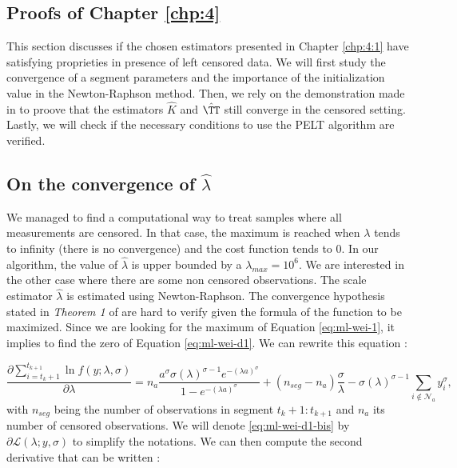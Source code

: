 \begin{appendices}
\chapter{Proofs of Chapter \ref{chp:4}} \label{app:chap4}

This section discusses if the chosen estimators presented in Chapter \ref{chp:4:1} have satisfying proprieties in presence of left censored data. We will first study the convergence of a segment parameters and the importance of the initialization value in the Newton-Raphson method. Then, we rely on the demonstration made in \cite{Lavielle1997} to proove that the estimators $\hat K$ and $\hat \TT$ still converge in the censored setting. Lastly, we will check if the necessary conditions to use the PELT algorithm are verified. 

\section{On the convergence of \texorpdfstring{$\hat\lambda$}{l}}

We managed to find a computational way to treat samples where all measurements are censored. In that case, the maximum is reached when $\lambda$ tends to infinity (there is no convergence) and the cost function tends to 0. In our algorithm, the value of $\hat\lambda$ is upper bounded by a $\lambda_{max} = 10^6$.   
We are interested in the other case where there are some non censored observations. The scale estimator $\hat\lambda$ is estimated using Newton-Raphson. The convergence hypothesis stated in \textit{Theorem 1} of \cite{Verbeke1995} are hard to verify given the formula of the function to be maximized. Since we are looking for the maximum of Equation \ref{eq:ml-wei-1}, it implies to find the zero of Equation \ref{eq:ml-wei-d1}. We can rewrite this equation : 

\begin{equation}\label{eq:ml-wei-d1-bis}
\frac{\partial\sum_{i=t_{k}+1}^{t_{k+1}}\ln f(y;\lambda,\sigma)}{\partial \lambda} = n_a\frac{a^\sigma\sigma(\lambda)^{\sigma-1}e^{-(\lambda a)^\sigma}}{1-e^{-(\lambda a)^\sigma}} + (n_{seg}-n_a)\frac{\sigma}{\lambda} - \sigma(\lambda)^{\sigma-1}\sum_{i \notin \mathcal{N}_a}y_i^{\sigma}, 
\end{equation}
with $n_{seg}$ being the number of observations in segment $t_{k}+1:t_{k+1}$ and $n_a$ its number of censored observations. We will denote \ref{eq:ml-wei-d1-bis} by $\partial\mathcal{L}(\lambda;y,\sigma)$ to simplify the notations. We can then compute the second derivative that can be written : 


\end{appendices}
